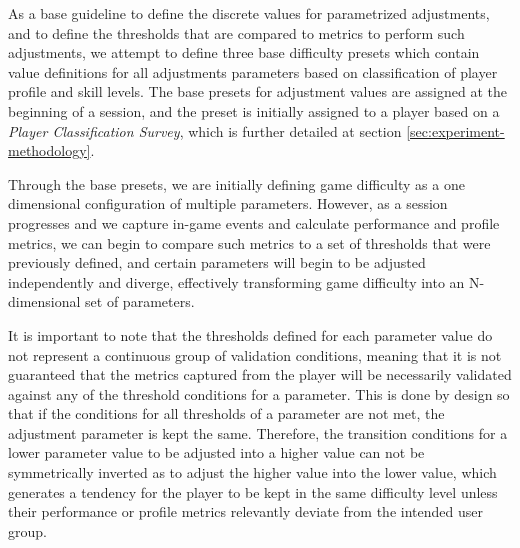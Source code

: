 

As a base guideline to define the discrete values for parametrized adjustments, and to define the thresholds that are compared to metrics to perform such adjustments, we attempt to define three base difficulty presets which contain value definitions for all adjustments parameters based on classification of player profile and skill levels. The base presets for adjustment values are assigned at the beginning of a session, and the preset is initially assigned to a player based on a \emph{Player Classification Survey}, which is further detailed at section \ref{sec:experiment-methodology}.

Through the base presets, we are initially defining game difficulty as a one dimensional configuration of multiple parameters. However, as a session progresses and we capture in-game events and calculate performance and profile metrics, we can begin to compare such metrics to a set of thresholds that were previously defined, and certain parameters will begin to be adjusted independently and diverge, effectively transforming game difficulty into an N-dimensional set of parameters.

It is important to note that the thresholds defined for each parameter value do not represent a continuous group of validation conditions, meaning that it is not guaranteed that the metrics captured from the player will be necessarily validated against any of the threshold conditions for a parameter. This is done by design so that if the conditions for all thresholds of a parameter are not met, the adjustment parameter is kept the same. Therefore, the transition conditions for a lower parameter value to be adjusted into a higher value can not be symmetrically inverted as to adjust the higher value into the lower value, which generates a tendency for the player to be kept in the same difficulty level unless their performance or profile metrics relevantly deviate from the intended user group.

